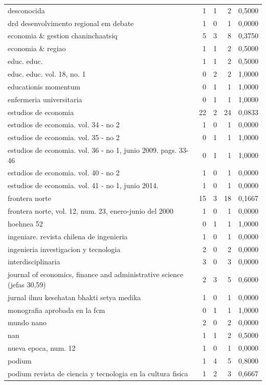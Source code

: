 \begin{longtable}{lrrrr}
desconocida & 1 & 1 & 2 & 0,5000\\
drd desenvolvimento regional em debate & 1 & 0 & 1 & 0,0000\\
economia \& gestion chaninchaatsiq & 5 & 3 & 8 & 0,3750\\
economia \& regiao & 1 & 1 & 2 & 0,5000\\
educ. educ. & 1 & 1 & 2 & 0,5000\\
educ. educ. vol. 18, no. 1 & 0 & 2 & 2 & 1,0000\\
educationis momentum & 0 & 1 & 1 & 1,0000\\
enfermeria universitaria & 0 & 1 & 1 & 1,0000\\
estudios de economia & 22 & 2 & 24 & 0,0833\\
estudios de economia. vol. 34 - no 2 & 1 & 0 & 1 & 0,0000\\
estudios de economia. vol. 35 - no 2 & 0 & 1 & 1 & 1,0000\\
estudios de economia. vol. 36 - no 1, junio 2009. pags. 33-46 & 0 & 1 & 1 & 1,0000\\
estudios de economia. vol. 40 - no 2 & 1 & 0 & 1 & 0,0000\\
estudios de economia. vol. 41 - no 1, junio 2014. & 1 & 0 & 1 & 0,0000\\
frontera norte & 15 & 3 & 18 & 0,1667\\
frontera norte, vol. 12, num. 23, enero-junio del 2000 & 1 & 0 & 1 & 0,0000\\
hoehnea 52 & 0 & 1 & 1 & 1,0000\\
ingeniare. revista chilena de ingenieria & 1 & 0 & 1 & 0,0000\\
ingenieria investigacion y tecnologia & 2 & 0 & 2 & 0,0000\\
interdisciplinaria & 3 & 0 & 3 & 0,0000\\
journal of economics, finance and administrative science (jefas 30,59) & 2 & 3 & 5 & 0,6000\\
jurnal ilmu kesehatan bhakti setya medika & 1 & 0 & 1 & 0,0000\\
monografia aprobada en la fcm & 0 & 1 & 1 & 1,0000\\
mundo nano & 2 & 0 & 2 & 0,0000\\
nan & 1 & 1 & 2 & 0,5000\\
nueva epoca, num. 12 & 1 & 0 & 1 & 0,0000\\
podium & 1 & 4 & 5 & 0,8000\\
podium revista de ciencia y tecnologia en la cultura fisica & 1 & 2 & 3 & 0,6667\\

\end{longtable}
